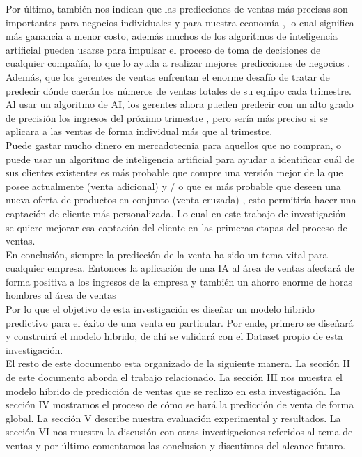 \documentclass[conference]{IEEEtran}
\begin{document}
Por último, también nos indican que las predicciones de ventas más precisas son importantes para negocios individuales y para nuestra economía \cite{b16}, lo cual significa más ganancia a menor costo, además muchos de los algoritmos de inteligencia artificial pueden usarse para impulsar el proceso de toma de decisiones de cualquier compañía, lo que lo ayuda a realizar mejores predicciones de negocios \cite{b19}. Además, que los gerentes de ventas enfrentan el enorme desafío de tratar de predecir dónde caerán los números de ventas totales de su equipo cada trimestre. Al usar un algoritmo de AI, los gerentes ahora pueden predecir con un alto grado de precisión los ingresos del próximo trimestre \cite{b19}, pero sería más preciso si se aplicara a las ventas de forma individual más que al trimestre.\\
Puede gastar mucho dinero en mercadotecnia para aquellos que no compran, o puede usar un algoritmo de inteligencia artificial para ayudar a identificar cuál de sus clientes existentes es más probable que compre una versión mejor de la que posee actualmente (venta adicional) y / o que es más probable que deseen una nueva oferta de productos en conjunto (venta cruzada) \cite{b19}, esto permitiría hacer una captación de cliente más personalizada. Lo cual en este trabajo de investigación se quiere mejorar esa captación del cliente en las primeras etapas del proceso de ventas.\\
En conclusión, siempre la predicción de la venta ha sido un tema vital para cualquier empresa. Entonces la aplicación de una IA al área de ventas afectará de forma positiva a los ingresos de la empresa y también un ahorro enorme de horas hombres al área de ventas\\
Por lo que el objetivo de esta investigación es diseñar un modelo hibrido predictivo para el éxito de una venta en particular. Por ende, primero se diseñará y construirá el modelo hibrido, de ahí se validará con el Dataset propio de esta investigación.\\
El resto de este documento esta organizado 
de la siguiente manera. La sección II de 
este documento aborda el trabajo relacionado. 
La sección III nos muestra el modelo 
hibrido de predicción de ventas que se realizo 
en esta investigación. La sección IV mostramos el 
proceso de cómo se hará la predicción de venta de forma global. 
La sección V describe nuestra evaluación experimental 
y resultados. La sección VI nos muestra 
la discusión con otras investigaciones referidos al tema de ventas 
y por último comentamos las conclusion y discutimos del alcance futuro.
\end{document}

